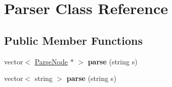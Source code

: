 \hypertarget{class_parser}{\section{Parser Class Reference}
\label{class_parser}
}
\subsection*{Public Member Functions}
\begin{DoxyCompactItemize}
\item 
\hypertarget{class_parser_a6c061189bf198a9ff82c850059bc6a07}{vector$<$ \hyperlink{struct_parse_node}{Parse\-Node} $\ast$ $>$ {\bfseries parse} (string s)}\label{class_parser_a6c061189bf198a9ff82c850059bc6a07}

\item 
\hypertarget{class_parser_a2914ae117a15611278821a451357200e}{vector$<$ string $>$ {\bfseries parse} (string s)}\label{class_parser_a2914ae117a15611278821a451357200e}

\end{DoxyCompactItemize}
